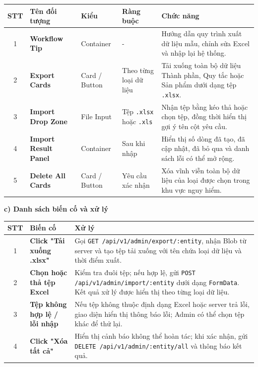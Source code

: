 \documentclass[12pt,a4paper]{article}
\begin{document}
\begin{center}
\renewcommand{\arraystretch}{1.5}
\begin{tabularx}{\textwidth}{|c|l|l|l|X|}
\hline
\rowcolor{blue!20}
\textbf{STT} & \textbf{Tên đối tượng} & \textbf{Kiểu} & \textbf{Ràng buộc} & \textbf{Chức năng} \\ \hline

1 & \textbf{Workflow Tip} & Container & - & Hướng dẫn quy trình xuất dữ liệu mẫu, chỉnh sửa Excel và nhập lại hệ thống. \\ \hline

2 & \textbf{Export Cards} & Card / Button & Theo từng loại dữ liệu & Tải xuống toàn bộ dữ liệu Thành phần, Quy tắc hoặc Sản phẩm dưới dạng tệp \texttt{.xlsx}. \\ \hline

3 & \textbf{Import Drop Zone} & File Input & Tệp \texttt{.xlsx} hoặc \texttt{.xls} & Nhận tệp bằng kéo thả hoặc chọn tệp, đồng thời hiển thị gợi ý tên cột yêu cầu. \\ \hline

4 & \textbf{Import Result Panel} & Container & Sau khi nhập & Hiển thị số dòng đã tạo, đã cập nhật, đã bỏ qua và danh sách lỗi có thể mở rộng. \\ \hline

5 & \textbf{Delete All Cards} & Card / Button & Yêu cầu xác nhận & Xóa vĩnh viễn toàn bộ dữ liệu của loại được chọn trong khu vực nguy hiểm. \\ \hline

\end{tabularx}
\end{center}

\textbf{c) Danh sách biến cố và xử lý}

\begin{center}
\renewcommand{\arraystretch}{1.5}
\begin{tabularx}{\textwidth}{|c|l|X|}
\hline
\rowcolor{blue!20}
\textbf{STT} & \textbf{Biến cố} & \textbf{Xử lý} \\ \hline

1 & \textbf{Click "Tải xuống .xlsx"} & Gọi \texttt{GET /api/v1/admin/export/:entity}, nhận Blob từ server và tạo tệp tải xuống với tên chứa loại dữ liệu và thời điểm xuất. \\ \hline

2 & \textbf{Chọn hoặc thả tệp Excel} & Kiểm tra đuôi tệp; nếu hợp lệ, gửi \texttt{POST /api/v1/admin/import/:entity} dưới dạng \texttt{FormData}. Kết quả xử lý được hiển thị theo từng loại dữ liệu. \\ \hline

3 & \textbf{Tệp không hợp lệ / lỗi nhập} & Nếu tệp không thuộc định dạng Excel hoặc server trả lỗi, giao diện hiển thị thông báo lỗi; Admin có thể chọn tệp khác để thử lại. \\ \hline

4 & \textbf{Click "Xóa tất cả"} & Hiển thị cảnh báo không thể hoàn tác; khi xác nhận, gửi \texttt{DELETE /api/v1/admin/:entity/all} và thông báo kết quả. \\ \hline

\end{tabularx}
\end{center}
\end{document}
